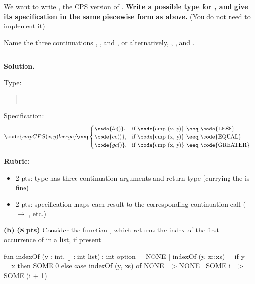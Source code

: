 \documentclass[crop=false]{standalone}
\newif\ifsol
\newenvironment{solution}
    {\par\color{solution_color}\begin{framed}\textbf{Solution.}\par}
    {\end{framed}}
\newcommand{\subpts}[1]{\textbf{(#1 pts)}}
\newcommand{\answerspace}[1]{\ifsol\else\vspace{#1}\par\fi}
\begin{document}
We want to write , the CPS version of . \textbf{Write
a possible type for , and give its specification in the same
piecewise form as  above.} (You do not need to implement
it)

Name the three continuations , , and , or
alternatively, , , and .

\vspace{0.3em}
\hspace{2em} \rule[-0.4ex]{0.8\textwidth}{0.4pt}

\answerspace{4cm}

\newpage

\begin{solution}
Type:
\begin{quote}
 \\
\hspace*{2em}
\end{quote}

Specification:
\[
  \code{cmpCPS (x, y) lc ec gc} \eeq
  \begin{cases}
    \code{lc ()}, & \text{if \code{cmp (x, y)} $\eeq$ \code{LESS}} \\
    \code{ec ()}, & \text{if \code{cmp (x, y)} $\eeq$ \code{EQUAL}} \\
    \code{gc ()}, & \text{if \code{cmp (x, y)} $\eeq$ \code{GREATER}}
  \end{cases}
\]

\textbf{Rubric:}
\begin{itemize}
  \item 2 pts: type has three  continuation arguments and
    return type  (currying the  is fine)
  \item 2 pts: specification maps each  result to the
    corresponding continuation call ( $\to$ , etc.)
\end{itemize}
\end{solution}

\vspace{0.5em}

\textbf{(b)} \subpts{8} Consider the function , which returns
the index of the first occurrence of  in a list, if present:

\begin{codeblock}
  fun indexOf (y : int, [] : int list) : int option = NONE
    | indexOf (y, x::xs) =
        if y = x then SOME 0
        else case indexOf (y, xs) of
               NONE   => NONE
             | SOME i => SOME (i + 1)
\end{codeblock}
\end{document}
